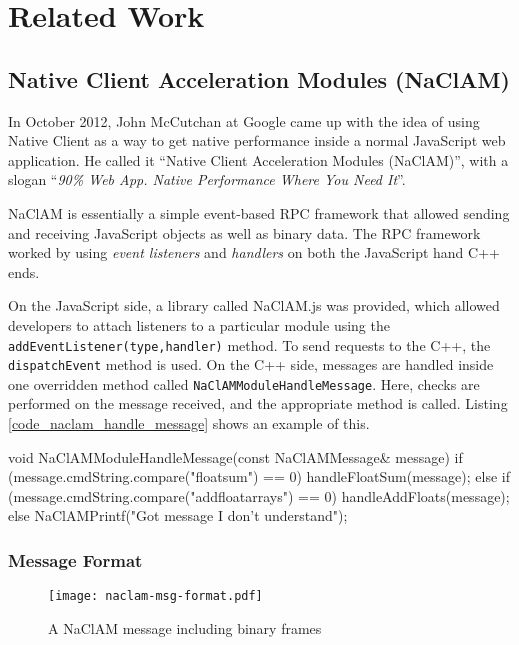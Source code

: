 \chapter{Related Work} 
\label{Chapter3} 
\section{Native Client Acceleration Modules (NaClAM)} %
\label{sec:naclam}

In October 2012, John McCutchan at Google came up with the idea of using Native Client as a way to get native performance inside a normal JavaScript web application. He called it ``Native Client Acceleration Modules (NaClAM)'', with a slogan ``\emph{90\% Web App. Native Performance Where You Need It}''.

NaClAM is essentially a simple event-based RPC framework that allowed sending and receiving JavaScript objects as well as binary data. The RPC framework worked by using \emph{event listeners} and \emph{handlers} on both the JavaScript hand C++ ends. 

On the JavaScript side, a library called NaClAM.js was provided, which allowed developers to attach listeners to a particular module using the \lstinline{addEventListener(type,handler)} method. To send requests to the C++, the \lstinline{dispatchEvent} method is used. On the C++ side, messages are handled inside one overridden method called \lstinline{NaClAMModuleHandleMessage}. Here, checks are performed on the message received, and the appropriate method is called. Listing \ref{code_naclam_handle_message} shows an example of this. 

\begin{code}
void NaClAMModuleHandleMessage(const NaClAMMessage& message) {
  if (message.cmdString.compare("floatsum") == 0) {
    handleFloatSum(message);
  } else if (message.cmdString.compare("addfloatarrays") == 0) {
    handleAddFloats(message);
  } else {
    NaClAMPrintf("Got message I don't understand");
  }
}
\end{code}

\subsection{Message Format} %
\label{sub:naclam_message_format}
\begin{figure}
	\centering
	\texttt{[image: naclam-msg-format.pdf]} 
	\caption{A NaClAM message including binary frames}
	\label{fig:naclam_msg_format}
\end{figure}

